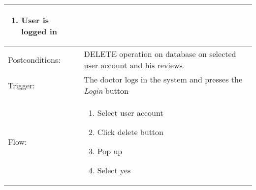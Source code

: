 \begin{longtable}{| p{3.5cm} | p{9cm} |}
\begin{enumerate}
\item User is logged in
\end{enumerate}\\
\hline
Postconditions: & DELETE operation on database on selected user account and his reviews.\\
\hline
Trigger: & The doctor logs in the system and presses the \textit{Login} button\\
\hline
Flow: &\mbox{}\par\vspace{-\baselineskip}
\begin{enumerate}
\item Select user account
\item Click delete button
\item Pop up
\item Select yes 
\end{enumerate}\\
\hline
\end{longtable}


